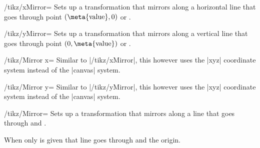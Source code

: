 \begin{key}{/tikz/xMirror=}
  Sets up a transformation that mirrors along a horizontal line that goes through point $(\text{\meta{value}}, 0)$ or .

\begin{codeexample}[preamble=\usetikzlibrary{ext.transformations.mirror}]
\end{codeexample}
\end{key}

\begin{key}{/tikz/yMirror=}
  Sets up a transformation that mirrors along a vertical line that goes through point $(0, \text{\meta{value}})$ or .
\end{key}


\begin{key}{/tikz/Mirror x=}
  Similar to |/tikz/xMirror|, this however uses the |xyz| coordinate system instead of the |canvas| system.
\begin{codeexample}[preamble=\usetikzlibrary{ext.transformations.mirror}]
\end{codeexample}
\end{key}

\begin{key}{/tikz/Mirror y=}
  Similar to |/tikz/yMirror|, this however uses the |xyz| coordinate system instead of the |canvas| system.
\end{key}


\begin{key}{/tikz/Mirror=}
  Sets up a transformation that mirrors along a line that goes through  and .
  
  When only  is given that line goes through  and the origin.
\end{key}

\endinput
